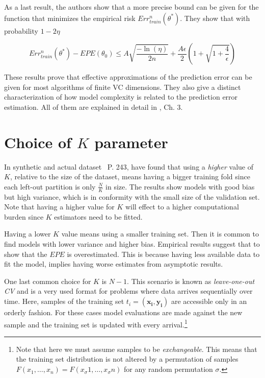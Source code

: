 \begin{appendices}
As a last result, the authors show that a more precise bound can be given for the function that minimizes the empirical risk $Err^n_{train}(\theta^*)$.
They show that with probability $1 - 2\eta$

\begin{equation}
Err^n_{train}(\theta^*) - EPE(\theta_0) \leq A \sqrt{\frac{-\ln(\eta)}{2n} } + \frac{A \epsilon}{2}\left( 1+ \sqrt{1 + \frac{4}{\epsilon} } \right)
\end{equation}\label{eq:vapnik-classificationBoundPrecise}

These results prove that effective approximations of the prediction error can be given for most algorithms of finite VC dimensions.
They also give a distinct characterization of how model complexity is related to the prediction error estimation.
All of them are explained in detail in \textcite{vapnik-nature2000}, Ch. 3. 



\section{Choice of \texorpdfstring{$K$ parameter}{Lg} }\label{appx:sec:optimalKfoldNumber}

In synthetic and actual dataset~\textcite{hastie-elemstatslearn} P.
243, have found that using a \textit{higher} value of $K$, relative to the size of the dataset, means having a bigger training fold since each left-out partition is only $\frac{N}{K}$ in size.
The results show models with good bias but high variance, which is in conformity with the small size of the validation set.
Note that having a higher value for $K$ will effect to a higher computational burden since $K$ estimators need to be fitted.

Having a lower $K$ value means using a smaller training set.
Then it is common to find models with lower variance and higher bias.
Empirical results suggest that to show that the $EPE$ is overestimated.
This is because having less available data to fit the model, implies having worse estimates from asymptotic results.

One last common choice for $K$ is $N-1$.
This scenario is known as \textit{leave-one-out CV} and is a very used format for problems where data arrives sequentially over time.
Here, samples of the training set $t_i = ( \boldsymbol{x_i} , \boldsymbol{y_i} )$ are accessible only in an orderly fashion.
For these cases model evaluations are made against the new sample and the training set is updated with every arrival.\footnote{Note that here we must assume samples to be \textit{exchangeable}.
	This means that the training set distribution is not altered by a permutation of samples $F(x_1,\ldots,x_n ) = F(x_\sigma{1},\ldots,x_\sigma{n})$ for any random permutation $\sigma$.}


\end{appendices}
